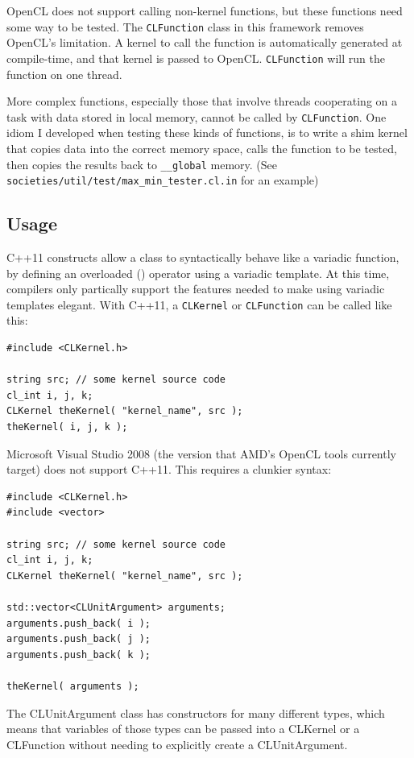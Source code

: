 \documentclass{article}
\begin{document}
OpenCL does not support calling non-kernel functions, but these functions need some way to be tested. The \texttt{CLFunction} class in this framework removes OpenCL's limitation. A kernel to call the function is automatically generated at compile-time, and that kernel is passed to OpenCL. \texttt{CLFunction} will run the function on one thread.

More complex functions, especially those that involve threads cooperating on a task with data stored in local memory, cannot be called by \texttt{CLFunction}. One idiom I developed when testing these kinds of functions, is to write a shim kernel that copies data into the correct memory space, calls the function to be tested, then copies the results back to \texttt{\_\_global} memory. (See \texttt{societies/util/test/max\_min\_tester.cl.in} for an example)

\subsection{Usage}
C++11 constructs allow a class to syntactically behave like a variadic function, by defining an overloaded () operator using a variadic template. At this time, compilers only partically support the features needed to make using variadic templates elegant. With C++11, a \texttt{CLKernel} or \texttt{CLFunction} can be called like this:

\begin{lstlisting}
#include <CLKernel.h>

string src; // some kernel source code
cl_int i, j, k;
CLKernel theKernel( "kernel_name", src );
theKernel( i, j, k );
\end{lstlisting}

Microsoft Visual Studio 2008 (the version that AMD's OpenCL tools currently target) does not support C++11. This requires a clunkier syntax:

\begin{lstlisting}
#include <CLKernel.h>
#include <vector>

string src; // some kernel source code
cl_int i, j, k;
CLKernel theKernel( "kernel_name", src );

std::vector<CLUnitArgument> arguments;
arguments.push_back( i ); 
arguments.push_back( j ); 
arguments.push_back( k ); 

theKernel( arguments );
\end{lstlisting}

The CLUnitArgument class has constructors for many different types, which means that variables of those types can be passed into a CLKernel or a CLFunction without needing to explicitly create a CLUnitArgument.
\end{document}

